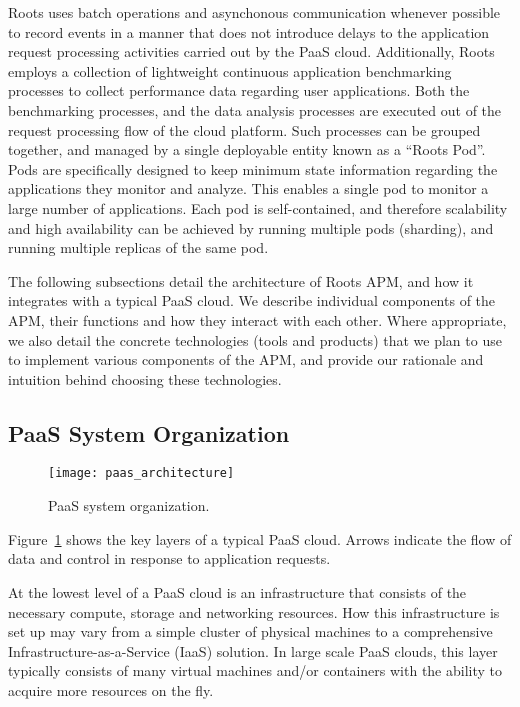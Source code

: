 Roots uses batch operations and asynchonous 
communication whenever possible to record events in a manner that does not introduce
delays to the application request processing activities carried out by the 
PaaS cloud. 
Additionally, Roots employs a collection of lightweight continuous application benchmarking
processes to collect performance data regarding user applications. Both
the benchmarking processes, and the data analysis processes are executed 
out of the request processing flow of the cloud platform. Such processes can be
grouped together, and managed by a single deployable entity known as a
``Roots Pod''. Pods are specifically designed to keep minimum state
information regarding the applications they monitor and analyze. This enables
a single pod to monitor a large number of applications. Each pod is self-contained,
and therefore scalability and high availability can be achieved by running multiple pods (sharding),
and running multiple replicas of the same pod.

The following subsections detail the architecture of Roots APM, and how it integrates with a typical PaaS
cloud. We describe individual components of the APM, their functions and how they interact with each
other. Where appropriate, we also detail the concrete technologies (tools and products) that we plan to use to implement
various components of the APM, and provide our rationale and intuition behind choosing these technologies.

\subsection{PaaS System Organization}
\begin{figure}
\centering
\texttt{[image: paas\_architecture]}
\caption{PaaS system organization.}
\label{fig:paas_architecture}
\end{figure}

Figure~\ref{fig:paas_architecture} shows the key layers of a typical PaaS cloud. Arrows indicate
the flow of data and control in response to application requests.

At the lowest level of a PaaS cloud is an infrastructure that consists of the necessary compute, storage
and networking resources. How this infrastructure is set up may vary from a simple cluster of physical 
machines to a comprehensive Infrastructure-as-a-Service (IaaS) solution. In large scale PaaS clouds,
this layer typically consists of many virtual machines and/or containers with the ability to acquire more
resources on the fly.

